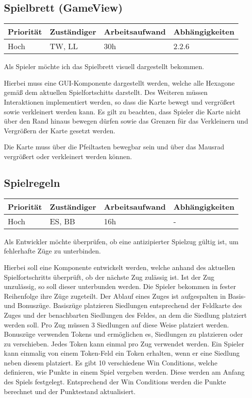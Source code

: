\documentclass[a4paper]{scrreprt}
\newenvironment{requirement}[5] {
	\subsection{#1}
	\begin{tabularx}{\textwidth}{|X|l|X|X|}
		\hline
		Priorität & Zuständiger & Arbeitsaufwand & Abhängigkeiten \\
		\hline
		#2 & #3 & #4 & #5 \\
		\hline
	\end{tabularx}
	}{
	\newpage
	}
\begin{document}
\begin{requirement}{Spielbrett (GameView)}{Hoch}{TW, LL}{30h}{2.2.6}

\begin{center}
	Als Spieler möchte ich das Spielbrett visuell dargestellt bekommen.
\end{center}

Hierbei muss eine GUI-Komponente dargestellt werden, welche alle Hexagone gemäß dem aktuellen Spielfortschitts darstellt. Des Weiteren müssen Interaktionen implementiert werden,
so dass die Karte bewegt und vergrößert sowie verkleinert werden kann. Es gilt zu beachten, dass Spieler die Karte nicht über den Rand hinaus bewegen dürfen sowie das Grenzen für das Verkleinern und Vergrößern der Karte gesetzt werden.

Die Karte muss über die Pfeiltasten bewegbar sein und über das Mausrad vergrößert oder verkleinert werden können.

\end{requirement}


\begin{requirement}{Spielregeln}{Hoch}{ES, BB}{16h}{-}

\begin{center}
	Als Entwickler möchte überprüfen, ob eine antizipierter Spielzug gültig ist, um fehlerhafte Züge zu unterbinden.
\end{center}

Hierbei soll eine Komponente entwickelt werden, welche anhand des aktuellen Spielfortschritts überprüft, ob der nächste Zug zulässig ist.
Ist der Zug unzulässig, so soll dieser unterbunden werden.
Die Spieler bekommen in fester Reihenfolge ihre Züge zugeteilt.
Der Ablauf eines Zuges ist aufgespalten in Basis- und Bonuszüge.
Basiszüge platzieren Siedlungen entsprechend der Feldkarte des Zuges und der benachbarten Siedlungen des Feldes, an dem die Siedlung platziert werden soll. Pro Zug müssen 3 Siedlungen auf diese Weise platziert werden.
Bonuszüge verwenden Tokens und ermöglichen es, Siedlungen zu platzieren oder zu verschieben. Jedes Token kann einmal pro Zug verwendet werden.
Ein Spieler kann einmalig von einem Token-Feld ein Token erhalten, wenn er eine Siedlung neben diesem platziert.
Es gibt 10 verschiedene Win Conditions, welche definieren, wie Punkte in einem Spiel vergeben werden. Diese werden am Anfang des Spiels festgelegt. Entsprechend der Win Conditions werden die Punkte berechnet und der Punktestand aktualisiert.


\end{requirement}
\end{document}
